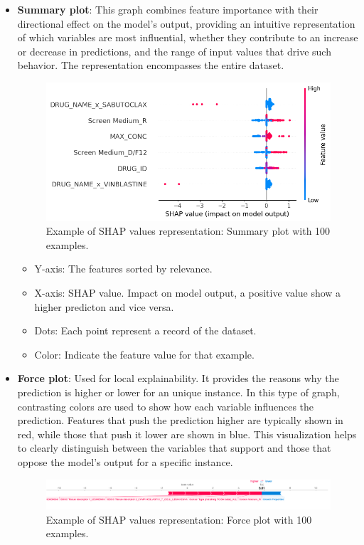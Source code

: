 \begin{itemize}
    \item \textbf{Summary plot}: This graph combines feature importance with their directional effect on the model's output, providing an intuitive representation of which variables are most influential, whether they contribute to an increase or decrease in predictions, and the range of input values that drive such behavior. The representation encompasses the entire dataset.
    
    \begin{figure}[H]
        \centering
        \includegraphics[width=1\textwidth]{figures/shap/shapValuesLittle.png}
        \caption{Example of SHAP values representation: Summary plot with 100 examples.}
        \label{fig:summaryPlot}
    \end{figure}

    \begin{itemize}
        \item Y-axis: The features sorted by relevance.
        \item X-axis: SHAP value. Impact on model output, a positive value show a higher predicton and vice versa.
        \item Dots: Each point represent a record of the dataset.
        \item Color: Indicate the feature value for that example.
    \end{itemize}
    

    \item \textbf{Force plot}: Used for local explainability. It provides the reasons why the prediction is higher or lower for an unique instance. In this type of graph, contrasting colors are used to show how each variable influences the prediction. Features that push the prediction higher are typically shown in red, while those that push it lower are shown in blue. This visualization helps to clearly distinguish between the variables that support and those that oppose the model's output for a specific instance.
    \begin{figure}[H]
        \centering
        \includegraphics[width=1\textwidth]{figures/shap/force_plot.png}
        \caption{Example of SHAP values representation: Force plot with 100 examples.}
        \label{fig:forcePlot}
    \end{figure}


\end{itemize}
